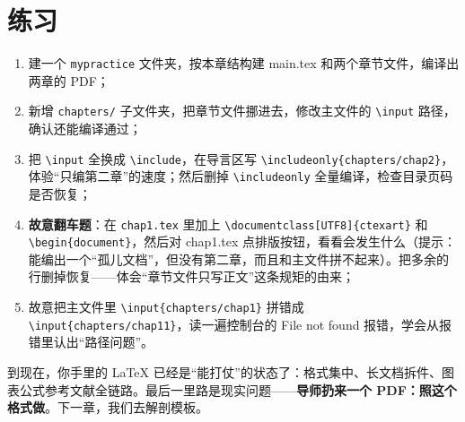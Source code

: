 \section*{练习}

\begin{enumerate}
\setlength{\itemsep}{2pt}
\item 建一个 \texttt{mypractice} 文件夹，按本章结构建 main.tex 和两个章节文件，编译出两章的 PDF；
\item 新增 \texttt{chapters/} 子文件夹，把章节文件挪进去，修改主文件的 \texttt{\textbackslash{}input} 路径，确认还能编译通过；
\item 把 \texttt{\textbackslash{}input} 全换成 \texttt{\textbackslash{}include}，在导言区写 \texttt{\textbackslash{}includeonly\{chapters/chap2\}}，体验“只编第二章”的速度；然后删掉 \texttt{\textbackslash{}includeonly} 全量编译，检查目录页码是否恢复；
\item \textbf{故意翻车题}：在 \texttt{chap1.tex} 里加上 \texttt{\textbackslash{}documentclass[UTF8]\{ctexart\}} 和 \texttt{\textbackslash{}begin\{document\}}，然后对 chap1.tex 点排版按钮，看看会发生什么（提示：能编出一个“孤儿文档”，但没有第二章，而且和主文件拼不起来）。把多余的行删掉恢复——体会“章节文件只写正文”这条规矩的由来；
\item 故意把主文件里 \texttt{\textbackslash{}input\{chapters/chap1\}} 拼错成 \texttt{\textbackslash{}input\{chapters/chap11\}}，读一遍控制台的 File not found 报错，学会从报错里认出“路径问题”。
\end{enumerate}

到现在，你手里的 LaTeX 已经是“能打仗”的状态了：格式集中、长文档拆件、图表公式参考文献全链路。最后一里路是现实问题——\textbf{导师扔来一个 PDF：照这个格式做}。下一章，我们去解剖模板。
